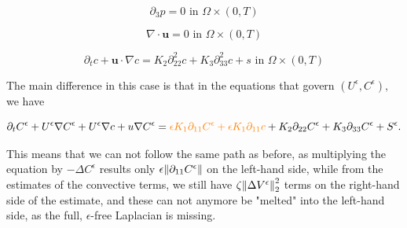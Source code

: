 \documentclass[11pt]{article}
\begin{document}
    \begin{equation} \label{HNSC3}   
    \partial_3 p = 0 \text{ in } \Omega \times (0,T)
    \end{equation}
    
    \begin{equation} \label{HNSC4}   
    \nabla \cdot \mathbf{u} = 0 \text{ in } \Omega \times (0,T)
    \end{equation}
    
    \begin{equation} \label{HNSC5}   
    \partial_t c + \mathbf{u} \cdot \nabla c = K_2 \partial_{22} ^ 2 c + K_3 \partial_{33} ^2 c + s \text{ in } \Omega \times (0,T)
    \end{equation}
    
The main difference in this case is that in the equations that govern $(U^\epsilon, C^\epsilon),$ we have

$$ \partial_t C^\epsilon + U^\epsilon \nabla C^\epsilon  + U^\epsilon \nabla c+ u \nabla C^\epsilon = \textcolor{orange}{\epsilon K_1 \partial_{11} C^\epsilon + \epsilon K_1 \partial_{11} c} + K_2 \partial_{22} C^\epsilon + K_3 \partial_{33} C^\epsilon + S^\epsilon. $$

This means that we can not follow the same path as before, as multiplying the equation by $- \Delta C^\epsilon$ results only $\epsilon \norm{\partial_{11} C^\epsilon}$ on the left-hand side, while from the estimates of the convective terms, we still have $\zeta \norm{\Delta V^\epsilon}^2_2$ terms on the right-hand side of the estimate, and these can not anymore be "melted" into the left-hand side, as the full, $\epsilon$-free Laplacian is missing.
\end{document}
